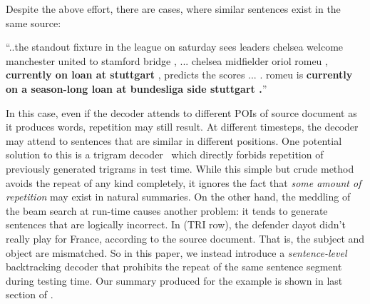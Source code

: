 Despite the above effort, there are cases, where similar sentences 
exist in the same source:
\begin{example}
\label{ex:repeatsrc}
\small{``..the standout fixture in the league on saturday sees leaders 
	   chelsea welcome manchester united to stamford bridge , ... 
	   chelsea midfielder oriol romeu , 
\textbf{currently on loan at stuttgart} , predicts 
the scores ... . romeu is \textbf{currently on a season-long 
loan at bundesliga side stuttgart .}''} 
\end{example}

In this case, even if the decoder attends to different POIs of 
source document as it produces words, repetition may still result.  
At different timesteps,
the decoder may attend 
to sentences that are similar in different positions.
One potential solution to this is a trigram decoder~\cite{PaulusXS17} 
which directly forbids repetition of previously generated trigrams in
test time. While this simple but crude method avoids the repeat of any kind
completely, 
it ignores the fact that \textit{some amount of repetition} may exist
in natural summaries.  
On the other hand, the meddling of the beam search at run-time causes another problem: 
it tends to generate sentences that are logically incorrect. 
In  (TRI row), the defender dayot didn't
really play for France, according to the source document.
That is, the subject and object are mismatched.
So in this paper, we instead introduce a {\em sentence-level} backtracking decoder
that prohibits the repeat of the same sentence segment during testing time.
Our summary produced for the example is shown in last section of 
.

%

